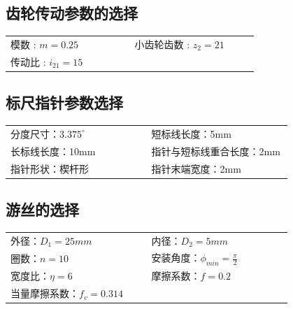 \subsection{齿轮传动参数的选择}
\begin{tabular}{@{}>{\raggedright\arraybackslash}p{0.4\linewidth}>{\raggedright\arraybackslash}p{0.4\linewidth}@{}}
模数 : $m=0.25$ &小齿轮齿数 : $z_2=21$\\
传动比 : $i_{21}=15$& 
\end{tabular}
\subsection{标尺指针参数选择}
\begin{tabular}{@{}>{\raggedright\arraybackslash}p{0.4\linewidth}>{\raggedright\arraybackslash}p{0.4\linewidth}@{}}
分度尺寸：$3.375^{\circ}$ & 短标线长度：5mm\\
长标线长度：10mm & 指针与短标线重合长度：2mm\\
指针形状：楔杆形& 指针末端宽度：2mm
\end{tabular}
\subsection{游丝的选择}
\begin{tabular}{@{}>{\raggedright\arraybackslash}p{0.4\linewidth}>{\raggedright\arraybackslash}p{0.4\linewidth}@{}}
外径：$D_1=25mm$ & 内径：$D_2=5mm$\\
圈数：$n=10$ & 安装角度：$\phi_{min}=\frac{\pi}{2}$\\
宽度比：$\eta=6$ & 摩擦系数：$f=0.2$\\
当量摩擦系数：$f_v=0.314$ & 
\end{tabular}